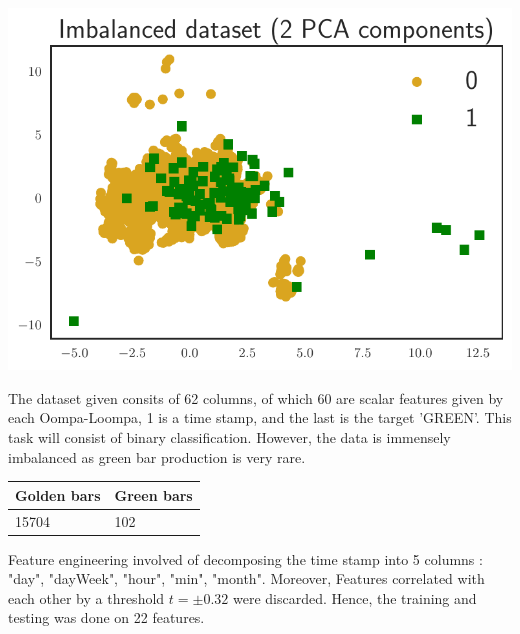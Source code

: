 \documentclass[landscape,a0paper,fontscale=0.285]{baposter} %
\begin{document}
\begin{poster}
{\begin{multicols}{2}
\begin{center}
\includegraphics[width=0.8\linewidth]{Imbalanced_dataset_(2_PCA_components)pca.pdf}
\label{pca}
\end{center}

The dataset given consits of 62 columns, of which 60 are scalar features given by each Oompa-Loompa, 1 is a time stamp, and the last is the target 'GREEN'. This task will consist of binary classification. However, the data is immensely imbalanced as green bar production is very rare.
\begin{center}
\begin{tabular}{l l}
\toprule
\textbf{Golden bars} & \textbf{Green bars} \\
\midrule
15704 & 102 \\
\bottomrule
\end{tabular}
\end{center}
Feature engineering involved of decomposing the time stamp into 5 columns : "day", "dayWeek", "hour", "min", "month". Moreover, Features correlated with each other by a threshold $t=\pm 0.32$  were discarded. Hence, the training  and testing was done on 22 features.
\end{multicols}


}
\end{poster}
\end{document}
